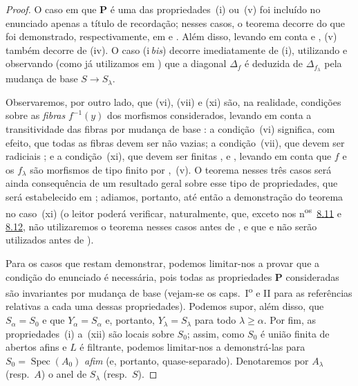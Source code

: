 \begin{proof}
O caso em que $\mathbf{P}$ é uma das propriedades~(i) ou~(v) foi incluído no enunciado apenas a título de recordação; nesses casos, o teorema decorre do que foi demonstrado, respectivamente, em  e .
Além disso, levando em conta  e , (v) também decorre de (iv).
O caso (i\,\emph{bis}) decorre imediatamente de (i), utilizando  e observando (como já utilizamos em ) que a diagonal $\Delta_f$ é deduzida de $\Delta_{f_\lambda}$ pela mudança de base $S\to S_\lambda$.

Observaremos, por outro lado, que (vi), (vii) e (xi) são, na realidade, condições sobre as \emph{fibras} $f^{-1}(y)$ dos morfismos considerados, levando em conta a transitividade das fibras por mudança de base : a condição~(vi) significa, com efeito, que todas as fibras devem ser não vazias; a condição~(vii), que devem ser radiciais ; e a condição~(xi), que devem ser finitas ,  e , levando em conta que $f$ e os $f_\lambda$ são morfismos de tipo finito por ,~(v).
O teorema nesses três casos será ainda consequência de um resultado geral sobre esse tipo de propriedades, que será estabelecido em ; adiamos, portanto, até então a demonstração do teorema no caso~(xi) (o leitor poderá verificar, naturalmente, que, exceto nos n\textsuperscript{os}~{\hyperlink{ega4.c04.subsec.8-11}{8.11}} e {\hyperlink{ega4.c04.subsec.8-12}{8.12}}, não utilizaremos o teorema nesses casos antes de , e que  e  não serão utilizados antes de ).

Para os casos que restam demonstrar, podemos limitar-nos a provar que a condição do enunciado é necessária, pois todas as propriedades $\mathbf{P}$ consideradas são invariantes por mudança de base (vejam-se os caps.~I\textsuperscript{o} e II para as referências relativas a cada uma dessas propriedades).
Podemos supor, além disso, que $S_\alpha=S_0$ e que $Y_\alpha=S_\alpha$ e, portanto, $Y_\lambda=S_\lambda$ para todo $\lambda\geqslant\alpha$.
Por fim, as propriedades~(i) a~(xii) são locais sobre $S_0$; assim, como $S_0$ é união finita de abertos afins e $L$ é filtrante, podemos limitar-nos a demonstrá-las para $S_0=\operatorname{Spec}(A_0)$ \emph{afim} (e, portanto, quase-separado).
Denotaremos por $A_\lambda$ (resp.\ $A$) o anel de $S_\lambda$ (resp.\ $S$).


\end{proof}
